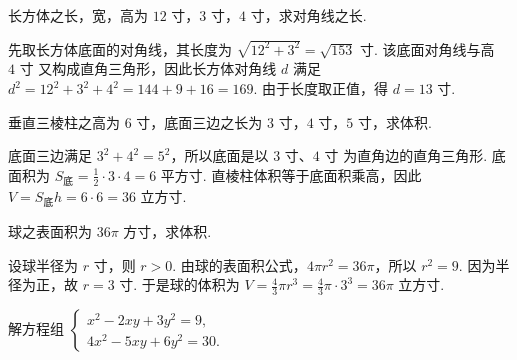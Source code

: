 \documentclass[UTF8,a4paper,oneside,11pt]{ctexbook}
\begin{document}
\begin{problem}
长方体之长，宽，高为 \(12\text{ 寸}\)，\(3\text{ 寸}\)，\(4\text{ 寸}\)，求对角线之长.
\end{problem}

\begin{solution}
先取长方体底面的对角线，其长度为 \(\sqrt{12^2+3^2}=\sqrt{153}\text{ 寸}\). 该底面对角线与高 \(4\text{ 寸}\) 又构成直角三角形，因此长方体对角线 \(d\) 满足 \(d^2=12^2+3^2+4^2=144+9+16=169\). 由于长度取正值，得 \(d=13\text{ 寸}\).
\end{solution}

\begin{problem}
垂直三棱柱之高为 \(6\text{ 寸}\)，底面三边之长为 \(3\text{ 寸}\)，\(4\text{ 寸}\)，\(5\text{ 寸}\)，求体积.
\end{problem}

\begin{solution}
底面三边满足 \(3^2+4^2=5^2\)，所以底面是以 \(3\text{ 寸}\)、\(4\text{ 寸}\) 为直角边的直角三角形. 底面积为 \(S_{\text{底}}=\frac12\cdot3\cdot4=6\text{ 平方寸}\). 直棱柱体积等于底面积乘高，因此 \(V=S_{\text{底}}h=6\cdot6=36\text{ 立方寸}\).
\end{solution}

\begin{problem}
球之表面积为 \(36\pi\text{ 方寸}\)，求体积.
\end{problem}

\begin{solution}
设球半径为 \(r\text{ 寸}\)，则 \(r>0\). 由球的表面积公式，\(4\pi r^2=36\pi\)，所以 \(r^2=9\). 因为半径为正，故 \(r=3\text{ 寸}\). 于是球的体积为 \(V=\frac43\pi r^3=\frac43\pi\cdot3^3=36\pi\text{ 立方寸}\).
\end{solution}

\begin{problem}
解方程组 \(\begin{cases}
x^{2} - 2xy + 3y^{2} = 9,\\
4x^{2} - 5xy + 6y^{2} = 30.
\end{cases}\)
\end{problem}
\end{document}
